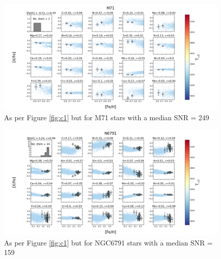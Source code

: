 \documentclass[14pt, preprint2]{aastex6}
\begin{document}
\begin{figure}
\centering
           \includegraphics[scale=0.5]{20elem8_tc2_nofilt.png}
  \caption{As per Figure \ref{fig:c1} but for M71 stars with a median SNR = 249 } %
\label{fig:c5}
\end{figure}


\begin{figure}
\centering
    \includegraphics[scale=0.5]{20elem-3_tc2_nofilt.png}
  \caption{As per Figure \ref{fig:c1} but for NGC6791 stars with a median SNR = 159 } %
\label{fig:c6}
\end{figure}
\end{document}
